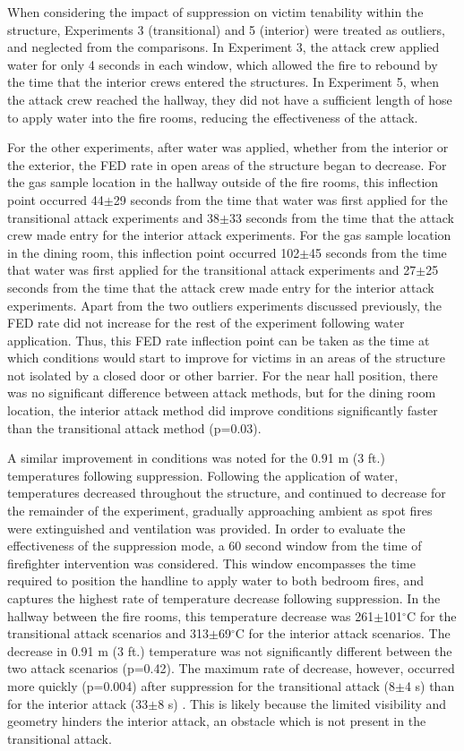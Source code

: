 \documentclass[12pt,oneside]{article}
\begin{document}
When considering the impact of suppression on victim tenability within the structure, Experiments 3 (transitional) and 5 (interior) were treated as outliers, and neglected from the comparisons. In Experiment 3, the attack crew applied water for only 4 seconds in each window, which allowed the fire to rebound by the time that the interior crews entered the structures. In Experiment 5, when the attack crew reached the hallway, they did not have a sufficient length of hose to apply water into the fire rooms, reducing the effectiveness of the attack. 

For the other experiments, after water was applied, whether from the interior or the exterior, the FED rate in open areas of the structure began to decrease. For the gas sample location in the hallway outside of the fire rooms, this inflection point occurred 44$\pm$29 seconds from the time that water was first applied for the transitional attack experiments and 38$\pm$33 seconds from the time that the attack crew made entry for the interior attack experiments. For the gas sample location in the dining room, this inflection point occurred 102$\pm$45 seconds from the time that water was first applied for the transitional attack experiments and 27$\pm$25 seconds from the time that the attack crew made entry for the interior attack experiments. Apart from the two outliers experiments discussed previously, the FED rate did not increase for the rest of the experiment following water application. Thus, this FED rate inflection point can be taken as the time at which conditions would start to improve for victims in an areas of the structure not isolated by a closed door or other barrier. For the near hall position, there was no significant difference between attack methods, but for the dining room location, the interior attack method did improve conditions significantly faster than the transitional attack method (p=0.03). 

A similar improvement in conditions was noted for the 0.91 m (3 ft.) temperatures following suppression. Following the application of water, temperatures decreased throughout the structure, and continued to decrease for the remainder of the experiment, gradually approaching ambient as spot fires were extinguished and ventilation was provided. In order to evaluate the effectiveness of the suppression mode, a 60 second window from the time of firefighter intervention was considered. This window encompasses the time required to position the handline to apply water to both bedroom fires, and captures the highest rate of temperature decrease following suppression. In the hallway between the fire rooms, this temperature decrease was 261$\pm$101$^{\circ}$C for the transitional attack scenarios and 313$\pm$69$^{\circ}$C for the interior attack scenarios. The decrease in 0.91 m (3 ft.) temperature was not significantly different between the two attack scenarios (p=0.42). The maximum rate of decrease, however, occurred more quickly (p=0.004) after suppression for the transitional attack (8$\pm$4 s) than for the interior attack (33$\pm$8 s) . This is likely because the limited visibility and geometry hinders the interior attack, an obstacle which is not present in the transitional attack. 
\end{document}
